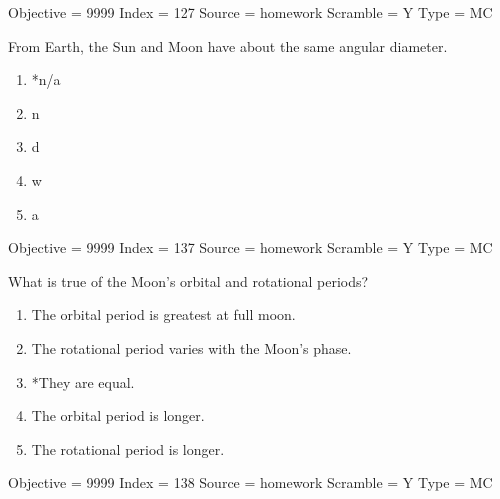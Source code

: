 \documentclass[11pt]{article}
\begin{document}
\begin{enumerate}
\begin{minipage}{\textwidth}
\begin{minipage}{\textwidth}
Objective = 9999
Index = 127
Source = homework
Scramble = Y
Type = MC
\end{minipage}
\end{minipage}
\vskip 0.20in

\begin{minipage}{\textwidth}
\begin{minipage}{\textwidth}
\item From Earth, the Sun and Moon have about the same angular diameter.
\begin{multicols}{3}
\begin{enumerate} 
\setlength{\itemsep}{1pt} 
\setlength{\parskip}{0pt} 
\setlength{\parsep}{0pt}
\setlength{\multicolsep}{1pt} 
\item *n/a
\item n
\item d
\item w
\item a
\end{enumerate} 
\vfill 
\end{multicols}

Objective = 9999
Index = 137
Source = homework
Scramble = Y
Type = MC
\end{minipage}
\end{minipage}
\vskip 0.20in

\begin{minipage}{\textwidth}
\begin{minipage}{\textwidth}
\item What is true of the Moon's orbital and rotational periods?
\begin{enumerate} 
\setlength{\itemsep}{1pt} 
\setlength{\parskip}{0pt} 
\setlength{\parsep}{0pt}
\setlength{\multicolsep}{1pt} 
\item The orbital period is greatest at full moon.
\item The rotational period varies with the Moon's phase.
\item *They are equal.
\item The orbital period is longer.
\item The rotational period is longer.
\end{enumerate} 
Objective = 9999
Index = 138
Source = homework
Scramble = Y
Type = MC
\end{minipage}
\end{minipage}
\vskip 0.20in


\end{enumerate}
\end{document}
